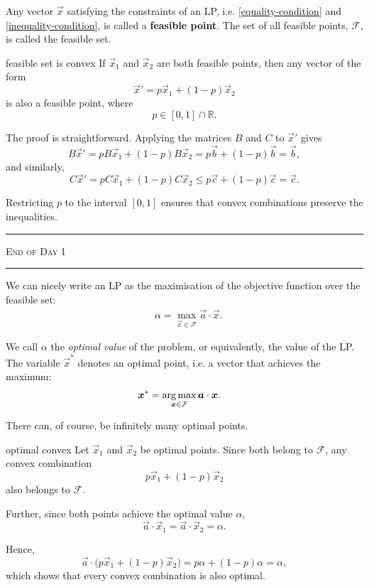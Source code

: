 Any vector $\vec{x}$ satisfying the constraints of an LP, i.e. \eqref{equality-condition} and \eqref{inequality-condition}, is called a \textbf{feasible point}. The set of all feasible points, $\mathcal{F}$, is called the feasible set.
\begin{theo}{feasible set is convex}
    If $\vec{x}_1$ and $\vec{x}_2$ are both feasible points, then any vector of the form
    \[
        \vec{x}' = p\vec{x}_1 + (1-p)\vec{x}_2
    \]
    is also a feasible point, where
    \[
        p \in [0,1] \cap \mathbb{R}.
    \]

    The proof is straightforward. Applying the matrices $B$ and $C$ to $\vec{x}'$ gives
    \[
        B\vec{x}'
        =
        pB\vec{x}_1 + (1-p)B\vec{x}_2
        =
        p\vec{b} + (1-p)\vec{b}
        =
        \vec{b},
    \]
    and similarly,
    \[
        C\vec{x}'
        =
        pC\vec{x}_1 + (1-p)C\vec{x}_2
        \le
        p\vec{c} + (1-p)\vec{c}
        =
        \vec{c}.
    \]

    Restricting $p$ to the interval $[0,1]$ ensures that convex combinations preserve the inequalities.
\end{theo}

\begin{center}
    {\color{quantumdeep}
        \rule{\linewidth}{0.6pt}

        \scshape\Large End of Day 1

        \rule{\linewidth}{0.6pt}}
\end{center}

We can nicely write an LP as the maximisation of the objective function over the feasible set:
\begin{align}
     & \alpha = \max_{\vec{x} \in \mathcal{F}} \vec{a} \cdot \vec{x}.
\end{align}

We call $\alpha$ the \textit{optimal value} of the problem, or equivalently, the value of the LP. The variable $\vec{x}^{*}$ denotes an optimal point, i.e. a vector that achieves the maximum:
\begin{align}
     & {\bm{{x}}}^{*} = \operatorname*{arg\,max}_{{\bm{{x}}} \in \mathcal{F}} {\bm{{a}}} \cdot {\ensuremath{\bm{{x}}}}.
\end{align}

There can, of course, be infinitely many optimal points.

\begin{theo}{optimal convex}
    Let $\vec{x}_1$ and $\vec{x}_2$ be optimal points. Since both belong to $\mathcal{F}$, any convex combination
    \[
        p\vec{x}_1 + (1-p)\vec{x}_2
    \]
    also belongs to $\mathcal{F}$.

    Further, since both points achieve the optimal value $\alpha$,
    \[
        \vec{a}\cdot\vec{x}_1
        =
        \vec{a}\cdot\vec{x}_2
        =
        \alpha.
    \]

    Hence,
    \[
        \vec{a}\cdot\bigl(p\vec{x}_1 + (1-p)\vec{x}_2\bigr)
        =
        p\alpha + (1-p)\alpha
        =
        \alpha,
    \]
    which shows that every convex combination is also optimal.
\end{theo}

